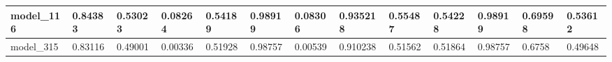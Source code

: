 \begin{tabular}{|l|l|l|l|l|l|l|l|l|l|l|l|l|}
model\_116     & 0.84383     & 0.53023        & 0.08264      & 0.54189          & 0.98919              & 0.08306              & 0.935218     & 0.55487           & 0.54228            & 0.98919         & 0.69598     & 0.53612      \\ \hline
model\_315     & 0.83116     & 0.49001        & 0.00336      & 0.51928          & 0.98757              & 0.00539              & 0.910238     & 0.51562           & 0.51864            & 0.98757         & 0.6758      & 0.49648      \\ \hline
\end{tabular}